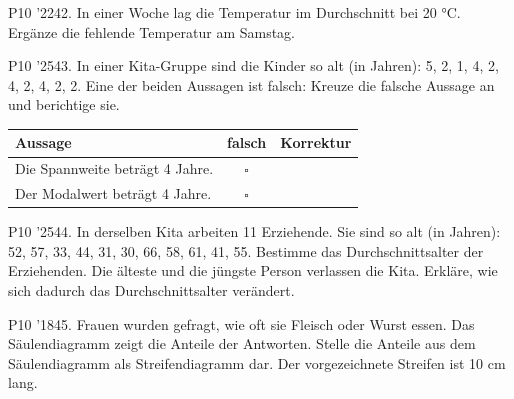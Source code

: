 \documentclass[11pt]{article}
\begin{document}
\pfgruppe{}
\begin{pfaufg}{P10 ’22}{42.}{}
In einer Woche lag die Temperatur im Durchschnitt bei 20 °C. Ergänze die fehlende Temperatur am Samstag.
\par\smallskip\noindent {}\par
{}
\end{pfaufg}
\pfgruppe{}
\begin{pfaufg}{P10 ’25}{43.}{}
In einer Kita-Gruppe sind die Kinder so alt (in Jahren): 5, 2, 1, 4, 2, 4, 2, 4, 2, 2. Eine der beiden Aussagen ist falsch: Kreuze die falsche Aussage an und berichtige sie.
\par\smallskip\noindent \begingroup\renewcommand{\arraystretch}{1.5}\begin{tabular}{|p{7.8cm}|c|p{3.4cm}|}\hline Aussage & falsch & Korrektur \\ \hline Die Spannweite beträgt 4 Jahre. & $\square$ &  \\ \hline Der Modalwert beträgt 4 Jahre. & $\square$ &  \\ \hline\end{tabular}\endgroup\par
{}
\end{pfaufg}
\pfgruppe{}
\begin{pfaufg}{P10 ’25}{\llap{\textasteriskcentered\,}44.}{}
In derselben Kita arbeiten 11 Erziehende. Sie sind so alt (in Jahren): 52, 57, 33, 44, 31, 30, 66, 58, 61, 41, 55. Bestimme das Durchschnittsalter der Erziehenden. Die älteste und die jüngste Person verlassen die Kita. Erkläre, wie sich dadurch das Durchschnittsalter verändert.
\end{pfaufg}
\pfgruppe{}
\begin{pfaufg}{P10 ’18}{45.}{}
Frauen wurden gefragt, wie oft sie Fleisch oder Wurst essen. Das Säulendiagramm zeigt die Anteile der Antworten. Stelle die Anteile aus dem Säulendiagramm als Streifendiagramm dar. Der vorgezeichnete Streifen ist 10 cm lang.
\par\smallskip\noindent {}\par
{}
\end{pfaufg}
\end{document}
